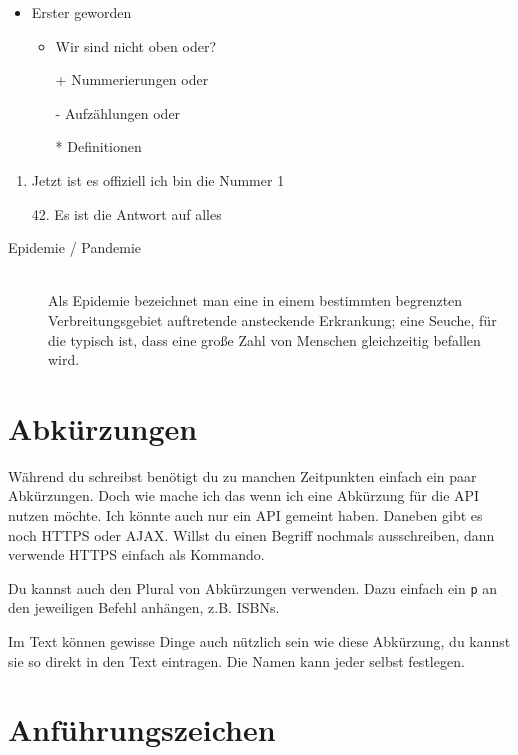 \begin{itemize}
	\item Erster geworden
	\begin{itemize}
		\item Wir sind nicht oben oder?
		\item[+] Nummerierungen oder
		\item[-] Aufzählungen oder
		\item[*] Definitionen 
	\end{itemize}
\end{itemize}

\begin{enumerate}
	\item Jetzt ist es offiziell ich bin die Nummer 1
	\item[42.] Es ist die Antwort auf alles
\end{enumerate}

\begin{description}
	\item[Epidemie / Pandemie] \hfill \\
	Als Epidemie bezeichnet man eine in einem bestimmten begrenzten Verbreitungsgebiet auftretende ansteckende Erkrankung; eine Seuche, für die typisch ist, dass eine große Zahl von Menschen gleichzeitig befallen wird.
\end{description}


\section{Abkürzungen}
Während du schreibst benötigt du zu manchen Zeitpunkten einfach ein paar Abkürzungen. Doch wie mache ich das wenn ich eine Abkürzung für die \ac{API} nutzen möchte. Ich könnte auch nur ein \ac{API} gemeint haben. Daneben gibt es noch \ac{HTTPS} oder \ac{AJAX}. Willst du einen Begriff nochmals ausschreiben, dann verwende \acf{HTTPS} einfach als Kommando.

Du kannst auch den Plural von Abkürzungen verwenden. Dazu einfach ein \texttt{p} an den jeweiligen Befehl anhängen, z.B. 
\acfp{ISBN}.

Im Text können gewisse Dinge auch nützlich sein wie \zB diese Abkürzung, \dash du kannst sie so direkt in den Text eintragen. Die Namen kann jeder selbst festlegen.


\section{Anführungszeichen}


